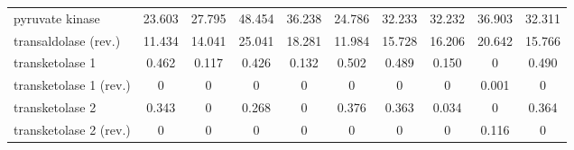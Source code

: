 \begin{table}[H]
{\begin{tabular}{|l|c|c|c|c|c|c|c|c|c|}
  pyruvate kinase                                                                                      & 23.603             & 27.795             & 48.454            & 36.238                                                                 & 24.786        & 32.233          & 32.232                 & 36.903          & 32.311            \\
  transaldolase (rev.)                                                                              & 11.434             & 14.041             & 25.041            & 18.281                                                                 & 11.984        & 15.728          & 16.206                 & 20.642          & 15.766            \\
  transketolase 1                                                                                      & 0.462              & 0.117              & 0.426             & 0.132                                                                  & 0.502         & 0.489           & 0.150                  & 0               & 0.490             \\
  transketolase 1 (rev.)                                                                            & 0                  & 0                  & 0                 & 0                                                                      & 0             & 0               & 0                      & 0.001           & 0                 \\
  transketolase 2                                                                                      & 0.343              & 0                  & 0.268             & 0                                                                      & 0.376         & 0.363           & 0.034                  & 0               & 0.364             \\
  transketolase 2 (rev.)                                                                            & 0                  & 0                  & 0                 & 0                                                                      & 0             & 0               & 0                      & 0.116           & 0                 \\ \hline
  \end{tabular}}
\end{table}
